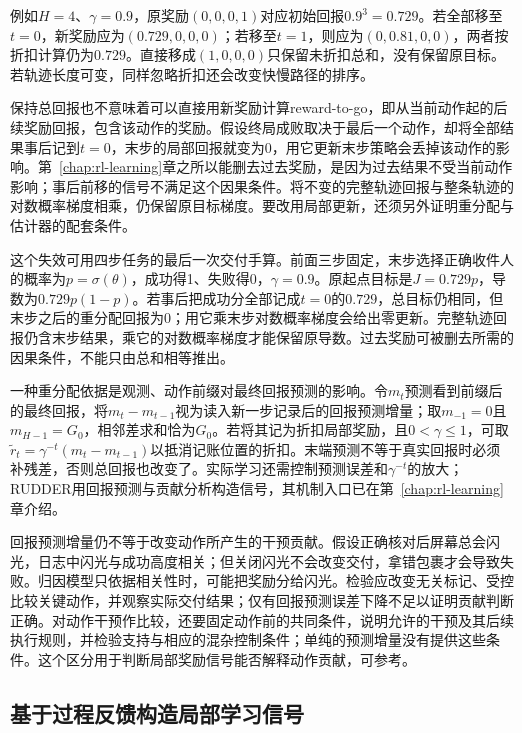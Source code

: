 例如$H=4$、$\gamma=0.9$，原奖励$(0,0,0,1)$对应初始回报$0.9^3=0.729$。若全部移至$t=0$，新奖励应为$(0.729,0,0,0)$；若移至$t=1$，则应为$(0,0.81,0,0)$，两者按折扣计算仍为$0.729$。直接移成$(1,0,0,0)$只保留未折扣总和，没有保留原目标。若轨迹长度可变，同样忽略折扣还会改变快慢路径的排序。

保持总回报也不意味着可以直接用新奖励计算reward-to-go，即从当前动作起的后续奖励回报，包含该动作的奖励。假设终局成败取决于最后一个动作，却将全部结果事后记到$t=0$，末步的局部回报就变为0，用它更新末步策略会丢掉该动作的影响。第~\ref{chap:rl-learning}章之所以能删去过去奖励，是因为过去结果不受当前动作影响；事后前移的信号不满足这个因果条件。将不变的完整轨迹回报与整条轨迹的对数概率梯度相乘，仍保留原目标梯度。要改用局部更新，还须另外证明重分配与估计器的配套条件。

这个失效可用四步任务的最后一次交付手算。前面三步固定，末步选择正确收件人的概率为$p=\sigma(\theta)$，成功得1、失败得0，$\gamma=0.9$。原起点目标是$J=0.729p$，导数为$0.729p(1-p)$。若事后把成功分全部记成$t=0$的$0.729$，总目标仍相同，但末步之后的重分配回报为0；用它乘末步对数概率梯度会给出零更新。完整轨迹回报仍含末步结果，乘它的对数概率梯度才能保留原导数。过去奖励可被删去所需的因果条件，不能只由总和相等推出。

一种重分配依据是观测、动作前缀对最终回报预测的影响。令$m_t$预测看到前缀后的最终回报，将$m_t-m_{t-1}$视为读入新一步记录后的回报预测增量；取$m_{-1}=0$且$m_{H-1}=G_0$，相邻差求和恰为$G_0$。若将其记为折扣局部奖励，且$0<\gamma\leq1$，可取$\widetilde r_t=\gamma^{-t}(m_t-m_{t-1})$以抵消记账位置的折扣。末端预测不等于真实回报时必须补残差，否则总回报也改变了。实际学习还需控制预测误差和$\gamma^{-t}$的放大；RUDDER用回报预测与贡献分析构造信号，其机制入口已在第~\ref{chap:rl-learning}章介绍。

回报预测增量仍不等于改变动作所产生的干预贡献。假设正确核对后屏幕总会闪光，日志中闪光与成功高度相关；但关闭闪光不会改变交付，拿错包裹才会导致失败。归因模型只依据相关性时，可能把奖励分给闪光。检验应改变无关标记、受控比较关键动作，并观察实际交付结果；仅有回报预测误差下降不足以证明贡献判断正确。对动作干预作比较，还要固定动作前的共同条件，说明允许的干预及其后续执行规则，并检验支持与相应的混杂控制条件；单纯的预测增量没有提供这些条件。这个区分用于判断局部奖励信号能否解释动作贡献，可参考。

\subsection{基于过程反馈构造局部学习信号}
\label{sec:rl-reward-process}

